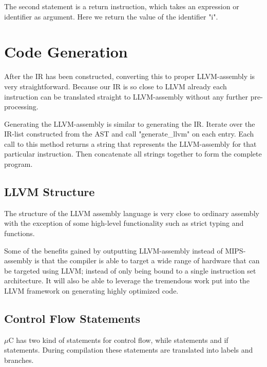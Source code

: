 The second statement is a return instruction, which takes an expression or identifier as argument. Here we return the value of the identifier "i".

\section{Code Generation}

After the IR has been constructed, converting this to proper LLVM-assembly is very straightforward. Because our IR is so close to LLVM already each instruction can be translated straight to LLVM-assembly without any further pre-processing.

Generating the LLVM-assembly is similar to generating the IR. Iterate over the IR-list constructed from the AST and call "generate\_llvm" on each entry. Each call to this method returns a string that represents the LLVM-assembly for that particular instruction. Then concatenate all strings together to form the complete program.

\subsection{LLVM Structure}

The structure of the LLVM assembly language is very close to ordinary assembly with the exception of some high-level functionality such as strict typing and functions.


Some of the benefits gained by outputting LLVM-assembly instead of MIPS-assembly is that the compiler is able to target a wide range of hardware that can be targeted using LLVM; instead of only being bound to a single instruction set architecture. It will also be able to leverage the tremendous work put into the LLVM framework on generating highly optimized code.

\subsection{Control Flow Statements}


$\mu$C has two kind of statements for control flow, while statements and if statements. During compilation these statements are translated into labels and branches.

